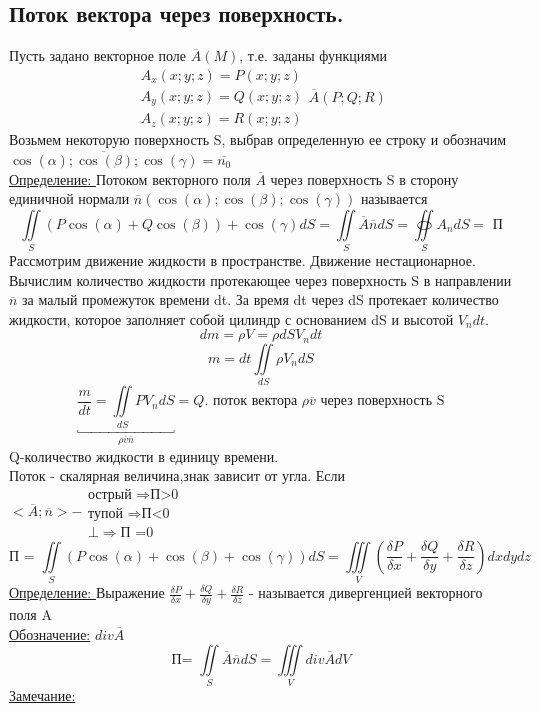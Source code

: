 \documentclass[12pt]{article}
\let\oldiint\iint
\let\oldiiint\iiint
\let\oldoiint\oiint
\renewcommand{\iint}{\oldiint\limits}
\renewcommand{\oiint}{\oldoiint\limits}
\renewcommand{\iiint}{\oldiiint\limits}
\begin{document}
  \subsection{Поток вектора через поверхность.}
  Пусть задано векторное поле $\overline{A}(M)$, т.е. заданы функциями
  \[\begin{matrix}
    A_x(x;y;z)=P(x;y;z)\\
    A_y(x;y;z)=Q(x;y;z)\\
    A_z(x;y;z)=R(x;y;z)
  \end{matrix} \overline{A}(P;Q;R)\]
  Возьмем некоторую поверхность S, выбрав определенную ее строку и обозначим $\overline{\cos(\alpha);\cos(\beta);\cos(\gamma)}=\overline{n_0}$\\
  \underline{Определение: } Потоком векторного поля $\overline{A}$ через поверхность S в сторону единичной нормали $\overline{n}(\cos(\alpha);\cos(\beta);\cos(\gamma))$ называется 
  \[\iint_S (P\cos(\alpha)+Q\cos(\beta))+\cos(\gamma)dS=\iint_S \overline{A} \overline{n}dS = \oiint_S A_n dS=\text{ П}\]
  Рассмотрим движение жидкости в пространстве. Движение нестационарное. Вычислим количество жидкости протекающее через поверхность S в направлении $\overline{n}$ за малый промежуток
  времени dt. За время dt через dS протекает количество жидкости, которое заполняет собой цилиндр с основанием dS
  и высотой $V_ndt$.
  \[dm=\rho V = \rho dS V_n dt\]
  \[m=dt\iint_{dS} \rho V_n dS\]
  \[\underbracket{\frac{m}{dt}=\iint_{dS}P V_n dS}_{\rho \overline{v} \overline{n}}=Q.\text{ поток вектора }
  \rho \overline{v} \text{ через поверхность S}\]
  Q-количество жидкости в единицу времени.\\
  Поток  - скалярная величина,знак зависит от угла.
  Если $<\overline{A};\overline{n}> - \begin{matrix}
  \text{острый } \Rightarrow \text{П>0}\\
  \text{тупой } \Rightarrow \text{П<0}\\
  \bot  \Rightarrow \text{П =0}
  \end{matrix}$
  \[\text{П = }\iint_S(P\cos(\alpha)+\cos(\beta)+\cos(\gamma))dS = \iiint_V 
  (\frac{\delta P}{\delta x}+\frac{\delta Q}{\delta y}+\frac{\delta R}{\delta z})dxdydz\]
  \underline{Определение: }
  Выражение $\frac{\delta P}{\delta x}+\frac{\delta Q}{\delta y}+\frac{\delta R}{\delta z}$ - называется дивергенцией
  векторного поля A\\
  \underline{Обозначение:} $div \overline{A}$
  \[\text{П= } \iint_S \overline{A} \overline{n} dS=\iiint_V div \overline{A} dV\]
  \underline{Замечание:}
\end{document}
